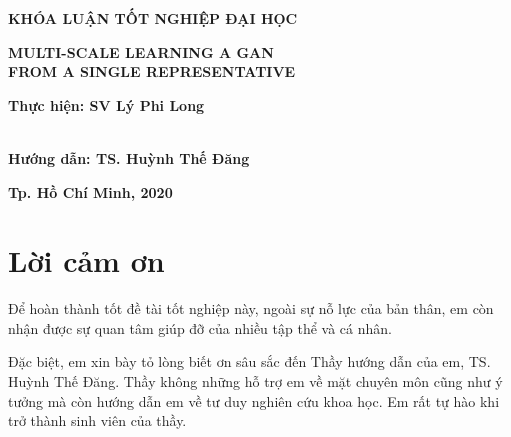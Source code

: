 \documentclass[12pt]{report}%
\begin{document}
\begin{titlepage}
\begin{center}
    
    

    
    \vspace{15pt}
    \fontsize{15pt}{15pt}\selectfont 
\textit{}    %
\vspace{10pt}
    \textbf{KHÓA LUẬN TỐT NGHIỆP ĐẠI HỌC}
    
\end{center}


\begin{center}
\vspace{5pt}
    \fontsize{20pt}{20pt}\selectfont 
    \textit{}
    \textbf{MULTI-SCALE LEARNING A GAN \\ FROM A SINGLE REPRESENTATIVE}
\end{center}
\begin{right}

\vspace{30pt}
\textbf{Thực hiện: SV Lý Phi Long}

\vspace{15pt}
 \\
\textbf{Hướng dẫn: TS. Huỳnh Thế Đăng}



\vspace{100pt}
\end{right}

\begin{center}
    \textbf{Tp. Hồ Chí Minh, 2020}
\end{center}
\end{titlepage}

\thispagestyle{empty}

\clearpage
\chapter*{Lời cảm ơn}
Để hoàn thành tốt đề tài tốt nghiệp này, ngoài sự nỗ lực của bản thân, em  còn nhận được sự quan tâm giúp đỡ của nhiều tập thể và cá nhân.

Đặc biệt, em xin bày tỏ lòng biết ơn sâu sắc đến Thầy hướng dẫn của em, TS. Huỳnh Thế Đăng. Thầy không những hỗ trợ em về mặt chuyên môn cũng như ý tưởng mà còn hướng dẫn em về tư duy nghiên cứu khoa học. Em rất tự hào khi trở thành sinh viên của thầy.
\end{document}
